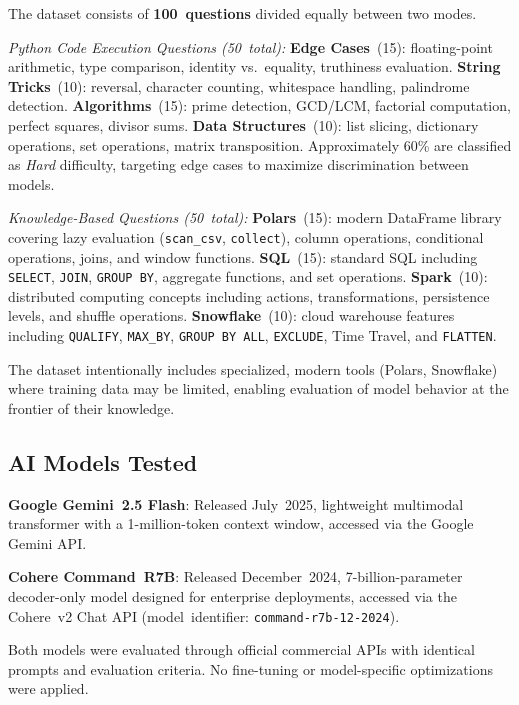 \documentclass[conference]{IEEEtran}
\begin{document}
The dataset consists of \textbf{100~questions} divided equally between two modes.

\textit{Python Code Execution Questions (50~total):}
\textbf{Edge Cases}~(15): floating-point arithmetic, type comparison, identity vs.\ equality, truthiness evaluation.
\textbf{String Tricks}~(10): reversal, character counting, whitespace handling, palindrome detection.
\textbf{Algorithms}~(15): prime detection, GCD/LCM, factorial computation, perfect squares, divisor sums.
\textbf{Data Structures}~(10): list slicing, dictionary operations, set operations, matrix transposition.
Approximately 60\% are classified as \emph{Hard} difficulty, targeting edge cases to maximize discrimination between models.

\textit{Knowledge-Based Questions (50~total):}
\textbf{Polars}~(15): modern DataFrame library covering lazy evaluation (\texttt{scan\_csv}, \texttt{collect}), column operations, conditional operations, joins, and window functions.
\textbf{SQL}~(15): standard SQL including \texttt{SELECT}, \texttt{JOIN}, \texttt{GROUP BY}, aggregate functions, and set operations.
\textbf{Spark}~(10): distributed computing concepts including actions, transformations, persistence levels, and shuffle operations.
\textbf{Snowflake}~(10): cloud warehouse features including \texttt{QUALIFY}, \texttt{MAX\_BY}, \texttt{GROUP BY ALL}, \texttt{EXCLUDE}, Time Travel, and \texttt{FLATTEN}.

The dataset intentionally includes specialized, modern tools (Polars, Snowflake) where training data may be limited, enabling evaluation of model behavior at the frontier of their knowledge.

\subsection{AI Models Tested}

\textbf{Google Gemini~2.5 Flash}: Released July~2025, lightweight multimodal transformer with a 1-million-token context window, accessed via the Google Gemini API.

\textbf{Cohere Command~R7B}: Released December~2024, 7-billion-parameter decoder-only model designed for enterprise deployments, accessed via the Cohere~v2 Chat API (model~identifier: \texttt{command-r7b-12-2024}).

Both models were evaluated through official commercial APIs with identical prompts and evaluation criteria. No fine-tuning or model-specific optimizations were applied.
\end{document}
